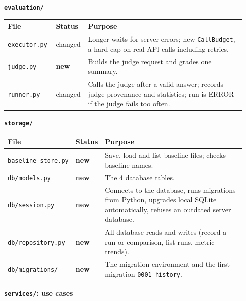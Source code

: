 \documentclass[11pt,a4paper]{article}
\newcommand{\code}[1]{\nolinkurl{#1}}
\newcommand{\new}{\textbf{new}}
\begin{document}
\textbf{\code{evaluation/}}

\begin{longtable}{@{}p{0.20\linewidth}p{0.09\linewidth}p{0.65\linewidth}@{}}
\toprule
\textbf{File} & \textbf{Status} & \textbf{Purpose} \\
\midrule
\endhead
\code{executor.py} & changed & Longer waits for server errors; new \code{CallBudget}, a hard cap on real API calls including retries. \\
\code{judge.py} & \new & Builds the judge request and grades one summary. \\
\code{runner.py} & changed & Calls the judge after a valid answer; records judge provenance and statistics; run is ERROR if the judge fails too often. \\
\bottomrule
\end{longtable}

\textbf{\code{storage/}}

\begin{longtable}{@{}p{0.22\linewidth}p{0.09\linewidth}p{0.63\linewidth}@{}}
\toprule
\textbf{File} & \textbf{Status} & \textbf{Purpose} \\
\midrule
\endhead
\code{baseline_store.py} & \new & Save, load and list baseline files; checks baseline names. \\
\code{db/models.py} & \new & The 4 database tables. \\
\code{db/session.py} & \new & Connects to the database, runs migrations from Python, upgrades local SQLite automatically, refuses an outdated server database. \\
\code{db/repository.py} & \new & All database reads and writes (record a run or comparison, list runs, metric trends). \\
\code{db/migrations/} & \new & The migration environment and the first migration \code{0001_history}. \\
\bottomrule
\end{longtable}

\textbf{\code{services/}: use cases}
\end{document}
